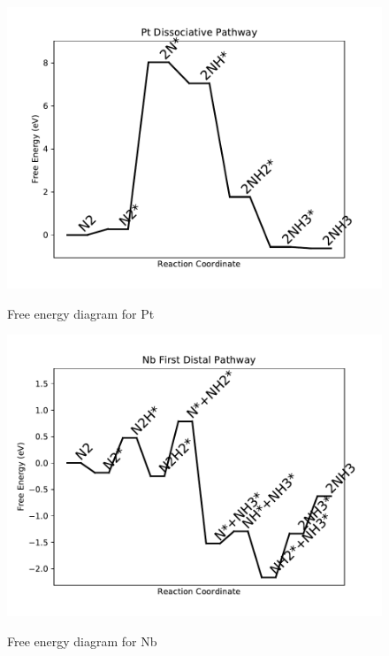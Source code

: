 \documentclass{article}
\begin{document}
\begin{figure}
\includegraphics[width=1\linewidth]{data/plots/Pt_dissociative.pdf}
\label{fig:Pt_dissociative}
\caption{Free energy diagram for Pt}
\end{figure}

\begin{figure}
\includegraphics[width=1\linewidth]{data/plots/Nb_distal_1.pdf}
\label{fig:Nb_distal_1}
\caption{Free energy diagram for Nb}
\end{figure}
\end{document}

